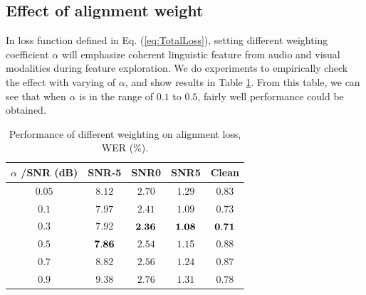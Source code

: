 \documentclass[conference]{IEEEtran}
\begin{document}
\subsection{Effect of alignment weight}
In loss function defined in Eq. (\ref{eq:TotalLoss}), setting different weighting coefficient $\alpha$ will emphasize coherent linguistic feature from audio and visual modalities during feature exploration. We do experiments to empirically check the effect with varying of $\alpha$, and show results in Table \ref{tab:tab4}. From this table, we can see that when $\alpha$ is in the range of $0.1$ to $0.5$, fairly well performance could be obtained.  
\begin{table}[tbh]
	\centering
	\caption{Performance of different weighting on alignment loss, WER (\%).}
	\begin{tabular}{|c||c||c||c||c|}
		\hline
		$\alpha$ /SNR (dB) &SNR-5 & SNR0 & SNR5 & Clean \\		
		\hline		
		\hline	
		$0.05$  & $8.12$ & $2.70$ &  $1.29$ &  $0.83$ \\		
		\hline	
		$0.1$  & $7.97$ & $2.41$ & $ 1.09$ &  $0.73$ \\		
		\hline			
		$0.3$  & $7.92$ & $\bf 2.36$ &  $\bf 1.08$ &  $\bf 0.71$ \\							
		\hline			
		$0.5$  & $\bf 7.86$ & $2.54$ &  $1.1$5 &  $0.88$ \\							
		\hline			
		$0.7$  & $8.82$ & $2.56$ &  $1.24$ &  $0.87$ \\							
		\hline		
		$0.9$  &$ 9.38$ & $2.76$ & $ 1.31$ &  $0.78$ \\							
		\hline		
	\end{tabular}
	\label{tab:tab4}
\end{table}


\end{document}
